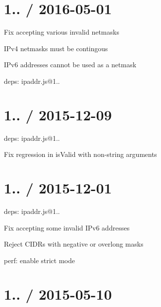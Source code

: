 \section*{1.. / 2016-\/05-\/01 }


\begin{DoxyItemize}
\item Fix accepting various invalid netmasks
\begin{DoxyItemize}
\item I\+Pv4 netmasks must be contingous
\item I\+Pv6 addresses cannot be used as a netmask
\end{DoxyItemize}
\item deps\+: ipaddr.\+js@1..
\end{DoxyItemize}

\section*{1.. / 2015-\/12-\/09 }


\begin{DoxyItemize}
\item deps\+: ipaddr.\+js@1..
\begin{DoxyItemize}
\item Fix regression in {\ttfamily is\+Valid} with non-\/string arguments
\end{DoxyItemize}
\end{DoxyItemize}

\section*{1.. / 2015-\/12-\/01 }


\begin{DoxyItemize}
\item deps\+: ipaddr.\+js@1..
\begin{DoxyItemize}
\item Fix accepting some invalid I\+Pv6 addresses
\item Reject C\+I\+D\+Rs with negative or overlong masks
\end{DoxyItemize}
\item perf\+: enable strict mode
\end{DoxyItemize}

\section*{1.. / 2015-\/05-\/10 }


